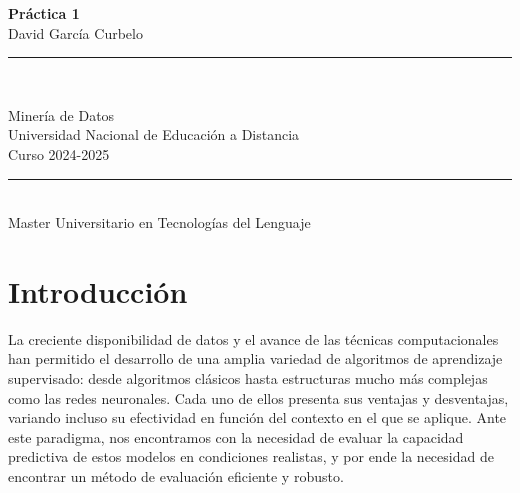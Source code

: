 \documentclass[a4paper,12pt]{article}
\begin{document}
\begin{titlepage}
    \centering
    \vspace*{1cm}

    {\Huge \textbf{Práctica 1}} \\[0.5cm]
    {\Large {David García Curbelo}}

    \vspace*{1cm}
    \rule{0.05\linewidth}{0.3mm} \\[0.4cm]
    \vspace*{1cm}

    \begin{large}
        Minería de Datos \\[0.2cm]
        Universidad Nacional de Educación a Distancia \\[0.5cm]
        Curso 2024-2025
    \end{large}

    \vfill

    \begin{minipage}{0.8\textwidth}
        \centering
        \vspace{0.5cm}
        \rule{0.9\linewidth}{0.3mm} \\[0.4cm]
        Master Universitario en Tecnologías del Lenguaje
    \end{minipage}
\end{titlepage}

\newpage
\tableofcontents
\newpage


\newpage

\section{Introducción}

La creciente disponibilidad de datos y el avance de las técnicas computacionales han permitido el desarrollo de una amplia variedad de algoritmos de aprendizaje supervisado: desde algoritmos clásicos hasta estructuras mucho más complejas como las redes neuronales. Cada uno de ellos presenta sus ventajas y desventajas, variando incluso su efectividad en función del contexto en el que se aplique. Ante este paradigma, nos encontramos con la necesidad de evaluar la capacidad predictiva de estos modelos en condiciones realistas, y por ende la necesidad de encontrar un método de evaluación eficiente y robusto.
\end{document}
